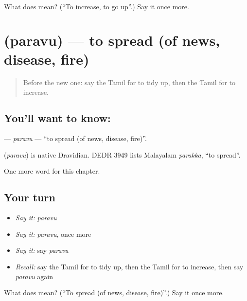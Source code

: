 \begin{tcolorbox}[breakable,colback=teal!4,colframe=teal!35!black,title={Before you move on}]
What does  mean? (\textquotedblleft{}To increase, to go up\textquotedblright{}.) Say it once more.
\end{tcolorbox}
\section[\texorpdfstring{\ta{பரவு} (paravu)}{பரவு (paravu)}]{ (paravu) — to spread (of news, disease, fire)}

\label{lesson:TA-C260-paravu}



\begin{quote}
Before the new one: say the Tamil for to tidy up, then the Tamil for to increase.
\end{quote}

\subsection*{You'll want to know: }
\textbf{} — \emph{paravu} — \textquotedblleft{}to spread (of news, disease, fire)\textquotedblright{}.

\begin{cousinweb}
\textbf{} (\emph{paravu}) is native Dravidian. DEDR 3949 lists Malayalam \emph{parakka}, \textquotedblleft{}to spread\textquotedblright{}.
\end{cousinweb}

\begin{grammarlens}[title={What you've built}]
One more word for this chapter.
\end{grammarlens}

\subsection*{Your turn}
\begin{itemize}
\raggedright
  \item \emph{Say it:} \emph{paravu}
  \item \emph{Say it:} \emph{paravu}, once more
  \item \emph{Say it:} say \emph{paravu}
  \item \emph{Recall:} say the Tamil for to tidy up, then the Tamil for to increase, then say \emph{paravu} again
\end{itemize}

\begin{tcolorbox}[breakable,colback=teal!4,colframe=teal!35!black,title={Before you move on}]
What does  mean? (\textquotedblleft{}To spread (of news, disease, fire)\textquotedblright{}.) Say it once more.
\end{tcolorbox}
